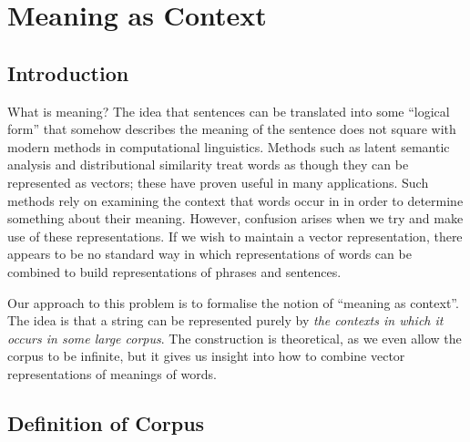 \documentclass[12pt]{report}
\begin{document}
\chapter{Meaning as Context}


\section{Introduction}

What is meaning? The idea that sentences can be translated into some ``logical form'' that somehow describes the meaning of the sentence does not square with modern methods in computational linguistics. Methods such as latent semantic analysis and distributional similarity treat words as though they can be represented as vectors; these have proven useful in many applications. Such methods rely on examining the context that words occur in in order to determine something about their meaning. However, confusion arises when we try and make use of these representations. If we wish to maintain a vector representation, there appears to be no standard way in which representations of words can be combined to build representations of phrases and sentences.

Our approach to this problem is to formalise the notion of ``meaning as context''. The idea is that a string can be represented purely by \emph{the contexts in which it occurs in some large corpus}. The construction is theoretical, as we even allow the corpus to be infinite, but it gives us insight into how to combine vector representations of meanings of words.

\section{Definition of Corpus}
\end{document}
